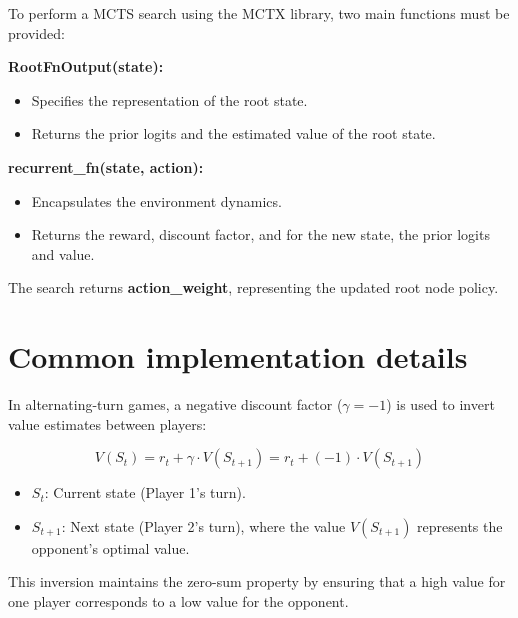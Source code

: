 \documentclass[aspectratio=169,xcolor=dvipsnames]{beamer}
\begin{document}
\begin{frame}{}
To perform a MCTS search using the MCTX library, two main functions must be provided:

\medskip
\textbf{RootFnOutput(state):}
\begin{itemize}
    \item Specifies the representation of the root state.
    \item Returns the prior logits and the estimated value of the root state.
\end{itemize}

\medskip
\textbf{recurrent\_fn(state, action):}
\begin{itemize}
    \item Encapsulates the environment dynamics.
    \item Returns the reward, discount factor, and for the new state, the prior logits and value.
\end{itemize}


\vspace{3.0em}
The search returns \textbf{action\_weight}, representing the updated root node policy.
\end{frame}

\section{Common implementation details}


\begin{frame}{}

In alternating-turn games, a negative discount factor (\(\gamma = -1\)) is used to invert value estimates between players:

\medskip
\[
V(S_t) = r_t + \gamma \cdot V(S_{t+1}) = r_t + (-1) \cdot V(S_{t+1})
\]
\begin{itemize}
    \item \(S_t\): Current state (Player 1’s turn).
    \item \(S_{t+1}\): Next state (Player 2’s turn), where the value \(V(S_{t+1})\) represents the opponent's optimal value.
\end{itemize}

\medskip
This inversion maintains the zero-sum property by ensuring that a high value for one player corresponds to a low value for the opponent.
\end{frame}
\end{document}
